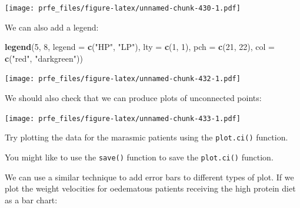 \documentclass[12pt,a4paper]{book}
\newenvironment{Shaded}{\begin{snugshade}}{\end{snugshade}}
\newcommand{\DataTypeTok}[1]{\textcolor[rgb]{0.13,0.29,0.53}{#1}}
\newcommand{\DecValTok}[1]{\textcolor[rgb]{0.00,0.00,0.81}{#1}}
\newcommand{\KeywordTok}[1]{\textcolor[rgb]{0.13,0.29,0.53}{\textbf{#1}}}
\newcommand{\NormalTok}[1]{#1}
\newcommand{\OperatorTok}[1]{\textcolor[rgb]{0.81,0.36,0.00}{\textbf{#1}}}
\newcommand{\StringTok}[1]{\textcolor[rgb]{0.31,0.60,0.02}{#1}}
\theoremstyle{definition}
\theoremstyle{definition}
\theoremstyle{definition}
\theoremstyle{remark}
\begin{document}
\texttt{[image: prfe\_files/figure-latex/unnamed-chunk-430-1.pdf]}

We can also add a legend:

\begin{Shaded}
\begin{Highlighting}[]
\KeywordTok{legend}\NormalTok{(}\DecValTok{5}\NormalTok{, }\DecValTok{8}\NormalTok{, }\DataTypeTok{legend =} \KeywordTok{c}\NormalTok{(}\StringTok{"HP"}\NormalTok{, }\StringTok{"LP"}\NormalTok{), }\DataTypeTok{lty =} \KeywordTok{c}\NormalTok{(}\DecValTok{1}\NormalTok{, }\DecValTok{1}\NormalTok{),}
       \DataTypeTok{pch =} \KeywordTok{c}\NormalTok{(}\DecValTok{21}\NormalTok{, }\DecValTok{22}\NormalTok{), }\DataTypeTok{col =} \KeywordTok{c}\NormalTok{(}\StringTok{"red"}\NormalTok{, }\StringTok{"darkgreen"}\NormalTok{))}
\end{Highlighting}
\end{Shaded}

\texttt{[image: prfe\_files/figure-latex/unnamed-chunk-432-1.pdf]}

We should also check that we can produce plots of unconnected points:

\begin{Shaded}
\end{Shaded}

\texttt{[image: prfe\_files/figure-latex/unnamed-chunk-433-1.pdf]}

Try plotting the data for the marasmic patients using the
\texttt{plot.ci()} function.

You might like to use the \texttt{save()} function to save the
\texttt{plot.ci()} function.

We can use a similar technique to add error bars to different types of
plot. If we plot the weight velocities for oedematous patients receiving
the high protein diet as a bar chart:

\begin{Shaded}
\end{Shaded}
\end{document}
